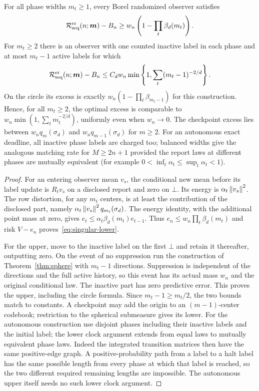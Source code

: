 \begin{theorem}\label{thm:singular}
For all phase widths $m_t\ge1$, every Borel randomized observer satisfies
\begin{equation}\label{eq:singular-lower}
 \mathcal R_{\rm seq}^{\rm er}(n;\boldsymbol m)-B_n
 \ge w_n\left(1-\prod_t\beta_d(m_t)\right).
\end{equation}
For $m_t\ge2$ there is an observer with one counted inactive label in each phase and at most $m_t-1$ active labels for which
\begin{equation}\label{eq:singular-upper}
 \mathcal R_{\rm seq}^{\rm er}(n;\boldsymbol m)-B_n
 \le C_d w_n\min\left\{1,\sum_t(m_t-1)^{-2/d}\right\}.
\end{equation}
On the circle its excess is exactly $w_n(1-\prod_t\beta_{m_t-1})$ for this construction. Hence, for all $m_t\ge2$, the optimal excess is comparable to
$w_n\min(1,\sum_t m_t^{-2/d})$, uniformly even when $w_n\to0$.
The checkpoint excess lies between $w_nq_m(\sigma_d)$ and $w_nq_{m-1}(\sigma_d)$ for $m\ge2$. For an autonomous exact deadline, all inactive phase labels are charged too; balanced widths give the analogous matching rate for $M\ge2n+1$ provided the report laws at different phases are mutually equivalent (for example $0<\inf_t\alpha_t\le\sup_t\alpha_t<1$).
\end{theorem}
\begin{proof}
For an entering observer mean $v_s$, the conditional new mean before its label update is $R_tv_s$ on a disclosed report and zero on $\bot$. Its energy is $\alpha_t\left\lVert v_s\right\rVert^2$. The row distortion, for any $m_t$ centers, is at least the contribution of the disclosed part, namely $\alpha_t\left\lVert v_s\right\rVert^2q_{m_t}(\sigma_d)$. The energy identity, with the additional point mass at zero, gives
$e_t\le\alpha_t\beta_d(m_t)e_{t-1}$.
Thus $e_n\le w_n\prod_t\beta_d(m_t)$ and risk $V-e_n$ proves~\eqref{eq:singular-lower}.

For the upper, move to the inactive label on the first $\bot$ and retain it thereafter, outputting zero. On the event of no suppression run the construction of Theorem~\ref{thm:sphere} with $m_t-1$ directions. Suppression is independent of the directions and the full active history, so this event has its actual mass $w_n$ and the original conditional law. The inactive part has zero predictive error. This proves the upper, including the circle formula. Since $m_t-1\ge m_t/2$, the two bounds match to constants. A checkpoint may add the origin to an $(m-1)$-center codebook; restriction to the spherical submeasure gives its lower. For the autonomous construction use disjoint phases including their inactive labels and the initial label; the lower clock argument extends from equal laws to mutually equivalent phase laws. Indeed the integrated transition matrices then have the same positive-edge graph. A positive-probability path from a label to a halt label has the same possible length from every phase at which that label is reached, so the two different required remaining lengths are impossible. The autonomous upper itself needs no such lower clock argument.
\end{proof}

